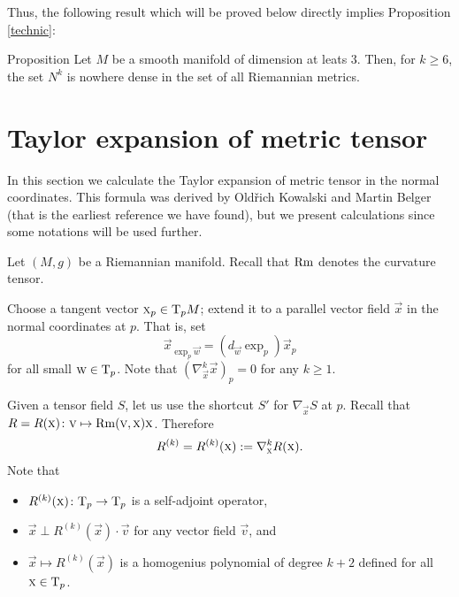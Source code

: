 \documentclass[a4paper,10pt]{article}
\begin{document}
  
  Thus, the following result which will be proved below directly implies Proposition \ref{technic}:
  
  \begin{thm}{Proposition}
  Let $M$  be a smooth manifold of dimension at leats $3$. Then, for $k\geq 6$,   the set $N^k$ is nowhere dense in the set of all Riemannian metrics.	
  	\end{thm}
 
 
  
 
 
 
  
\section{Taylor expansion of metric tensor}\label{sec:jet}

In this section we calculate the Taylor expansion of metric tensor in the normal coordinates.
This formula was derived by Old\v{r}ich Kowalski and Martin Belger \cite[Proposition 2.2]{kowalski-belger} (that is the earliest reference we have found),
but we present calculations since some notations will be used further.

Let $(M,g)$ be a Riemannian manifold.
Recall that $\operatorname{Rm}$ denotes the curvature tensor.

Choose a tangent vector $\text{\sc{x}}_p\in \mathrm{T}_pM$; 
extend it to a parallel vector field $\vec{x}$ in the normal coordinates at $p$.
That is, set 
\[\vec{x}_{\exp_p\vec{w}}=(d_\vec{w}\exp_p)\vec{x}_p\] for all small $\text{\sc{w}}\in \mathrm{T}_p$.
Note that $(\nabla^k_\vec{x} \vec{x})_p=0$ for any $k\ge 1$.

Given a tensor field $S$, let us use the shortcut $S'$  for $\nabla_\vec{x}S$ at $p$.
Recall that $R=R(\text{\sc{x}})\colon\text{\sc{v}}\mapsto \operatorname{Rm}(\text{\sc{v}},\text{\sc{x}})\text{\sc{x}}$.
Therefore
\[R^{(k)}=R^{(k)}(\text{\sc{x}})\mathrel{{:}{=}}\nabla^k_{\text{\sc{x}}}R(\text{\sc{x}}).\]
Note that 
\begin{itemize}
\item $R^{(k)}(\text{\sc{x}})\colon\mathrm{T}_p\to\mathrm{T}_p$ is a self-adjoint operator, 
\item $\vec{x}\perp R^{(k)}(\vec{x})\cdot \vec{v}$ for any vector field $\vec{v}$, and
\item $\vec{x}\mapsto R^{(k)}(\vec{x})$ is a homogenius polynomial of degree $k+2$ defined for all $\text{\sc{x}}\in \mathrm{T}_p$.
\end{itemize}

 
\end{document}
